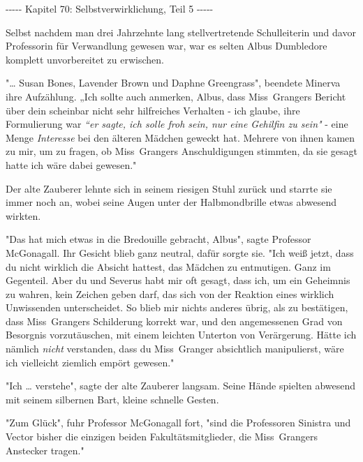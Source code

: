 

\hypertarget{selbstverwirklichung-teil-5}{%

-\/-\/-\/-\/- Kapitel 70: Selbstverwirklichung, Teil 5 -\/-\/-\/-\/-

Selbst nachdem man drei Jahrzehnte lang stellvertretende Schulleiterin und davor Professorin für Verwandlung gewesen war, war es selten Albus Dumbledore komplett unvorbereitet zu erwischen.

"… Susan Bones, Lavender Brown und Daphne Greengrass", beendete Minerva ihre Aufzählung. „Ich sollte auch anmerken, Albus, dass Miss~Grangers Bericht über dein scheinbar nicht sehr hilfreiches Verhalten - ich glaube, ihre Formulierung war \emph{“er sagte, ich solle froh sein, nur eine Gehilfin zu sein"} - eine Menge \emph{Interesse} bei den älteren Mädchen geweckt hat. Mehrere von ihnen kamen zu mir, um zu fragen, ob Miss~Grangers Anschuldigungen stimmten, da sie gesagt hatte ich wäre dabei gewesen."

Der alte Zauberer lehnte sich in seinem riesigen Stuhl zurück und starrte sie immer noch an, wobei seine Augen unter der Halbmondbrille etwas abwesend wirkten.

"Das hat mich etwas in die Bredouille gebracht, Albus", sagte Professor McGonagall. Ihr Gesicht blieb ganz neutral, dafür sorgte sie. "Ich weiß jetzt, dass du nicht wirklich die Absicht hattest, das Mädchen zu entmutigen. Ganz im Gegenteil. Aber du und Severus habt mir oft gesagt, dass ich, um ein Geheimnis zu wahren, kein Zeichen geben darf, das sich von der Reaktion eines wirklich Unwissenden unterscheidet. So blieb mir nichts anderes übrig, als zu bestätigen, dass Miss~Grangers Schilderung korrekt war, und den angemessenen Grad von Besorgnis vorzutäuschen, mit einem leichten Unterton von Verärgerung. Hätte ich nämlich \emph{nicht} verstanden, dass du Miss~Granger absichtlich manipulierst, wäre ich vielleicht ziemlich empört gewesen."

"Ich … verstehe", sagte der alte Zauberer langsam. Seine Hände spielten abwesend mit seinem silbernen Bart, kleine schnelle Gesten.

"Zum Glück", fuhr Professor McGonagall fort, "sind die Professoren Sinistra und Vector bisher die einzigen beiden Fakultätsmitglieder, die Miss~Grangers Anstecker tragen."

}
